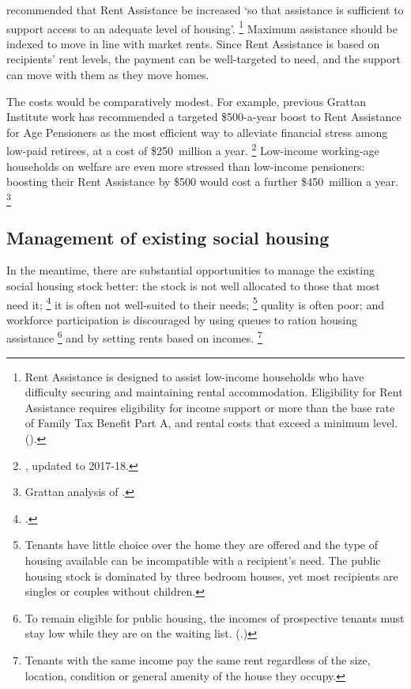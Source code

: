 \textcite[][491]{HenryTaxReview2010-Part2-Detailed-analysis} recommended that Rent Assistance be increased `so that assistance is sufficient to support access to an adequate level of housing'.%
	\footnote{Rent Assistance is designed to assist low-income households who have difficulty securing and maintaining rental accommodation.
	Eligibility for Rent Assistance requires eligibility for income support or more than
	the base rate of Family Tax Benefit Part A, and rental costs that exceed a minimum level.
	 (\textcite{DHS2017-Rent-assistance}).}
Maximum assistance should be indexed to move in line with market rents.
Since Rent Assistance is based on recipients' rent levels, the payment can be well-targeted to need, and the support can move with them as they move homes.

The costs would be comparatively modest.
For example, previous Grattan Institute work has recommended a targeted \$500-a-year boost to Rent Assistance for Age Pensioners as the most efficient way to alleviate financial stress among low-paid retirees, at a cost of \$250~million a year.%
	\footnote{\textcite{Daley-etal-2016-theConvo-Govt-shouldnt-use-super-for-low-income-savers}, updated to 2017-18.}
Low-income working-age households on welfare are even more stressed than low-income pensioners: boosting their Rent Assistance by \$500
would cost a further \$450~million a year.%
	\footnote{Grattan analysis of \textcites{SocialServices2015DepartmentSocialServices}{SocialServices2016DepartmentSocialServicesa}.}
	
\subsection{Management of existing social housing}\label{subsec:Management-existing-social-housing}

In the meantime, there are substantial opportunities to manage the existing social housing stock better: the stock is not well allocated to those that most need it;%
    \footcites{DHS_kpmg_social_housing_2012}{Potter-2017-Affordablehousing}
it is often not well-suited to their needs;%
    \footnote{Tenants have little choice over the home they are offered and the type of housing available can be incompatible with a recipient’s need.
    The public housing stock is dominated by three bedroom houses, yet most recipients are singles or couples without children.}
quality is often poor; and workforce participation is discouraged by using queues to ration housing assistance%
    \footnote{To remain eligible for public housing, the incomes of prospective tenants must stay low while they are on the waiting list. (\textcites[][595]{HenryTaxReview2010-Part2-Detailed-analysis}{Potter-2017-Affordablehousing}.)}
and by setting rents based on incomes.%
    \footnote{Tenants with the same income pay the same rent regardless of the size, location, condition or general amenity of the house they occupy.}
    

    










